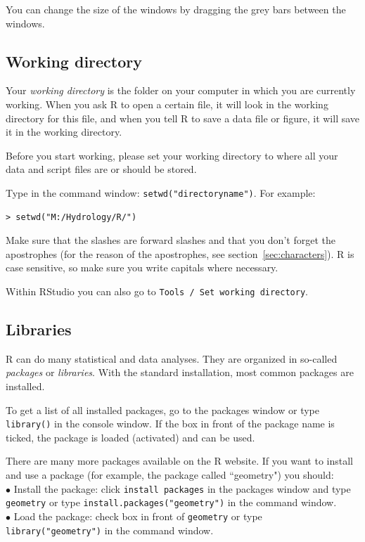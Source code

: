 \documentclass[a4paper,11pt,twocolumn,tablecaptionabove]{scrartcl} %
\begin{document}
You can change the size of the windows by dragging the grey bars between the windows.

\subsection{Working directory}

Your \emph{working directory} is the folder on your computer in which you are currently working. When you ask R to open a certain file, it will look in the working directory for this file, and when you tell R to save a data file or figure, it will save it in the working directory.

Before you start working, please set your working directory to where all your data and script files are or should be stored.

Type in the command window: \verb!setwd("directoryname")!.  For example:
\begin{Verbatim}[frame=single,gobble=0]
> setwd("M:/Hydrology/R/")
\end{Verbatim}
Make sure that the slashes are forward slashes and that you don't forget the apostrophes (for the reason of the apostrophes, see section~\ref{sec:characters}). R is case sensitive, so make sure you write capitals where necessary.

Within RStudio you can also go to \texttt{Tools / Set working directory}.

\subsection{Libraries} 

R can do many statistical and data analyses. 
They are organized in so-called \emph{packages} or \emph{libraries}. 
With the standard installation, most common packages are installed.  

To get a list of all installed packages, go to the packages window or type \verb!library()! in the console window. 
If the box in front of the package name is ticked, the package is loaded (activated) and can be used. 

There are many more packages available on the R website.
If you want to install and use a package (for example, the package called ``geometry") you should:\\
\noindent $\bullet$ Install the package:  click \texttt{install packages} in the packages window and type \texttt{geometry} or type \verb!install.packages("geometry")! in the command window.\\
\noindent $\bullet$ Load the package: check box in front of \texttt{geometry} or type \verb!library("geometry")! in the command window. 
\end{document}
